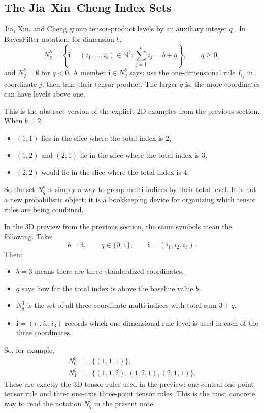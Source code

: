\documentclass[11pt]{article}
\numberwithin{equation}{section}
\begin{document}
\subsection{The Jia--Xin--Cheng Index Sets}
\label{subsec:p32-source-index-sets}

Jia, Xin, and Cheng group tensor-product levels by an auxiliary integer \(q\)
\cite[Eq. 27]{jia2012sparsegrid}.  In BayesFilter notation, for dimension
\(b\),
\begin{equation}
  N_q^b
  =
  \left\{\mathbf i=(i_1,\ldots,i_b)\in\mathbb N^b:
  \sum_{j=1}^b i_j=b+q\right\},
  \qquad q\ge 0,
  \label{eq:p32-Nqb}
\end{equation}
and \(N_q^b=\emptyset\) for \(q<0\).  A member
\(\mathbf i\in N_q^b\) says: use the one-dimensional rule \(I_{i_j}\) in
coordinate \(j\), then take their tensor product.  The larger \(q\) is, the
more coordinates can have levels above one.

This is the abstract version of the explicit 2D examples from the previous
section.  When \(b=2\):
\begin{itemize}[leftmargin=0.28in]
  \item \((1,1)\) lies in the slice where the total index is \(2\),
  \item \((1,2)\) and \((2,1)\) lie in the slice where the total index is
  \(3\),
  \item \((2,2)\) would lie in the slice where the total index is \(4\).
\end{itemize}
So the set \(N_q^b\) is simply a way to group multi-indices by their total
level.  It is not a new probabilistic object; it is a bookkeeping device for
organizing which tensor rules are being combined.

In the 3D preview from the previous section, the same symbols mean the following.
Take:
\begin{equation}
  b=3,
  \qquad
  q\in\{0,1\},
  \qquad
  \mathbf i=(i_1,i_2,i_3).
  \label{eq:p38-3d-index-symbols}
\end{equation}
Then:
\begin{itemize}[leftmargin=0.28in]
  \item \(b=3\) means there are three standardized coordinates,
  \item \(q\) says how far the total index is above the baseline value \(b\),
  \item \(N_q^3\) is the set of all three-coordinate multi-indices with total
  sum \(3+q\),
  \item \(\mathbf i=(i_1,i_2,i_3)\) records which one-dimensional rule level is
  used in each of the three coordinates.
\end{itemize}
So, for example,
\begin{align}
  N_0^3 &= \{(1,1,1)\},
  \label{eq:p38-N03}\\
  N_1^3 &= \{(1,1,2),(1,2,1),(2,1,1)\}.
  \label{eq:p38-N13}
\end{align}
These are exactly the 3D tensor rules used in the preview: one central
one-point tensor rule and three one-axis three-point tensor rules.  This is the
most concrete way to read the notation \(N_q^b\) in the present note.
\end{document}
